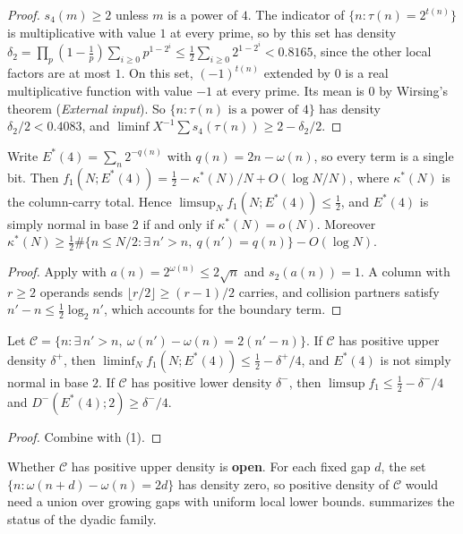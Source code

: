 \documentclass[11pt]{article}
\begin{document}
\begin{proof}
$s_4(m)\ge2$ unless $m$ is a power of $4$. The indicator of $\{n:\tau(n)=2^{t(n)}\}$ is multiplicative with value $1$ at every prime, so by  this set has density $\delta_2=\prod_p(1-\frac1p)\sum_{i\ge0}p^{1-2^i}\le\frac12\sum_{i\ge0}2^{1-2^i}<0.8165$, since the other local factors are at most $1$. On this set, $(-1)^{t(n)}$ extended by $0$ is a real multiplicative function with value $-1$ at every prime. Its mean is $0$ by Wirsing's theorem \cite{Wirsing1967} (\emph{External input}). So $\{n:\tau(n)\text{ is a power of }4\}$ has density $\delta_2/2<0.4083$, and $\liminf X^{-1}\sum s_4(\tau(n))\ge2-\delta_2/2$.
\end{proof}

\begin{theorem}\label{thm:Estar4}
Write $E^*(4)=\sum_n2^{-q(n)}$ with $q(n)=2n-\omega(n)$, so every term is a single bit. Then $f_1(N;E^*(4))=\frac12-\kappa^*(N)/N+O(\log N/N)$, where $\kappa^*(N)$ is the column-carry total. Hence $\limsup_Nf_1(N;E^*(4))\le\frac12$, and $E^*(4)$ is simply normal in base $2$ if and only if $\kappa^*(N)=o(N)$. Moreover $\kappa^*(N)\ge\frac12\#\{n\le N/2:\exists\,n'>n,\ q(n')=q(n)\}-O(\log N)$.
\end{theorem}

\begin{proof}
Apply  with $a(n)=2^{\omega(n)}\le2\sqrt n$ and $s_2(a(n))=1$. A column with $r\ge2$ operands sends $\lfloor r/2\rfloor\ge(r-1)/2$ carries, and collision partners satisfy $n'-n\le\frac12\log_2n'$, which accounts for the boundary term.
\end{proof}

\begin{proposition}[Collisions]\label{prop:collisions}
Let $\mathcal C=\{n:\exists\,n'>n,\ \omega(n')-\omega(n)=2(n'-n)\}$. If $\mathcal C$ has positive upper density $\delta^+$, then $\liminf_Nf_1(N;E^*(4))\le\frac12-\delta^+/4$, and $E^*(4)$ is not simply normal in base $2$. If $\mathcal C$ has positive lower density $\delta^-$, then $\limsup f_1\le\frac12-\delta^-/4$ and $D^-(E^*(4);2)\ge\delta^-/4$.
\end{proposition}

\begin{proof}
Combine  with (1).
\end{proof}

Whether $\mathcal C$ has positive upper density is \textbf{open}. For each fixed gap $d$, the set $\{n:\omega(n+d)-\omega(n)=2d\}$ has density zero, so positive density of $\mathcal C$ would need a union over growing gaps with uniform local lower bounds.  summarizes the status of the dyadic family.
\end{document}
